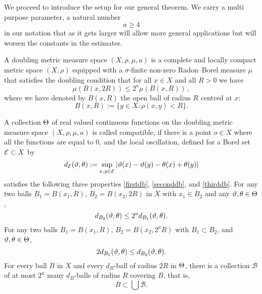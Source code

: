 We proceed to introduce the setup for our general theorem.
We carry a multi purpose parameter, a natural number
\begin{equation}
    a\ge 4
\end{equation} in our notation that as it gets larger will allow more general applications but will worsen the constants in the estimates.



A doubling metric measure space  $(X,\rho,\mu, a)$ is a complete
and locally compact metric space $(X,\rho)$
equipped with a $\sigma$-finite non-zero Radon--Borel measure $\mu$ that satisfies the doubling condition that for all $x\in X$ and all $R>0$ we have
\begin{equation}\label{doublingx}
    \mu(B(x,2R))\le 2^a\mu(B(x,R))\,,
\end{equation}
where we have denoted by $B(x,R)$ the open ball of radius $R$ centred at $x$:
\begin{equation}\label{eq define ball}
 B(x,R):=\{y\in X: \rho(x,y)<R\}. \end{equation}


A  collection $\Theta$ of real valued continuous functions on the doubling metric measure space $(X,\rho,\mu,a)$ is called compatible, if there is a point $o\in X$ where all the functions are equal to $0$, and the  local oscillation, defined for a Borel set $\mathcal{E}\subset X$ by
\begin{equation}\label{definedE}
    d_{\mathcal{E}}(\vartheta,\theta):=\sup_{x,y\in \mathcal{E}}|\vartheta(x)-{\vartheta(y)}- \theta(x)+{\theta(y)}|
\end{equation}
satisfies the following three properties
\eqref{firstdb}, \eqref{seconddb}, and \eqref{thirddb}.
For any two balls $B_1=B(x_1,R)$, $B_2= B(x_2,2R)$ in $X$ with $x_1\in B_2$  and any $\vartheta,\theta\in \Theta$,
\begin{equation}\label{firstdb}
    d_{B_2}(\vartheta,\theta)\le 2^a d_{B_1}(\vartheta,\theta) .
\end{equation}
For any two balls
$B_1=B(x_1,R)$, $B_2= B(x_2,2^aR)$
with $B_1\subset B_2$, and $\vartheta,\theta\in \Theta$,
\begin{equation}\label{seconddb}
    2d_{B_1}(\vartheta,\theta)
\le d_{B_2}(\vartheta,\theta) .
\end{equation}
For every ball $B$ in $X$ and
every $d_B$-ball of radius $2R$ in $\Theta$, there is a collection $\mathcal{B}$ of
at most $2^a$ many  $d_B$-balls of radius $R$ covering $B$, that is,
\begin{equation}\label{thirddb}
    B\subset \bigcup \mathcal{B}.
\end{equation}


